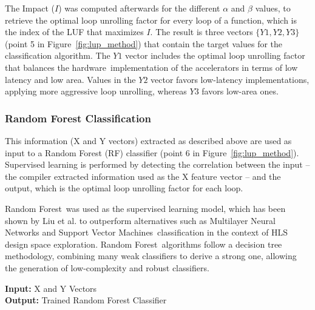 \documentclass[]{usiinfthesis}
\newcommand{\HW}{{hardware}}
\newcommand{\RF}{{Random Forest}}
\newcommand{\SVM}{{Support Vector Machines}}
\begin{document}
The Impact ($I$) was computed afterwards for the different $\alpha$
and $\beta$ values, to retrieve the optimal loop unrolling factor for every loop
of a function, which is the index of the LUF that maximizes $I$. The
result is three vectors $\{Y1,Y2,Y3\}$ (point 5 in
Figure~\ref{fig:lup_method}) that contain the target values for the
classification algorithm. The $Y1$ vector includes the optimal loop
unrolling factor that balances the \HW\ implementation of the
accelerators in terms of low latency and low area. Values in the $Y2$
vector favors low-latency implementations, applying more aggressive
loop unrolling, whereas $Y3$ favors low-area ones.


\subsubsection{Random Forest Classification}
\label{subsec:rf}

This information (X and Y vectors) extracted as described above are used 
as input to a Random Forest (RF) classifier (point 6 in
Figure~\ref{fig:lup_method}).
Supervised learning is performed by detecting the correlation between 
the input -- the compiler extracted information used as the X feature vector -- 
and the output, which is the optimal loop unrolling factor for each loop.\par

\RF\ was used as the supervised learning model, which has been shown by Liu et al.
\cite{LiuJun13} to outperform alternatives such as Multilayer Neural Networks and \SVM\  
classification in the context of HLS design space exploration. \RF\ algorithms follow
a decision tree methodology, combining many weak classifiers to derive a strong one, allowing
the generation of low-complexity and robust classifiers.\par

\begin{algorithm}[t]
\begin{flushleft}
\textbf{Input:}  X and Y Vectors\\
\textbf{Output:} Trained Random Forest Classifier\\
\end{flushleft}
\begin{algorithmic}[1]
  \State{\emph{ /*\ Training\ Phase\ */} }
\EndFor
\end{algorithmic}
\caption{Random Forest Classification -
 Training and Test} 
 \label{algo:RF}
\end{algorithm}
\end{document}
